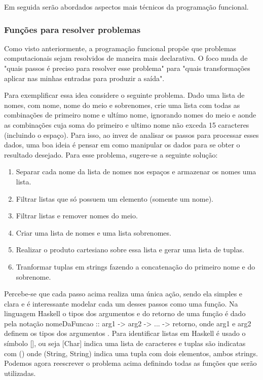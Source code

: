 Em seguida serão abordados aspectos mais técnicos da programação funcional.

\subsubsection{Funções para resolver problemas}

Como visto anteriormente, a programação funcional propõe que problemas computacionais sejam resolvidos de maneira mais declarativa.
O foco muda de "quais passos é preciso para resolver esse problema" para "quais transformações aplicar nas minhas entradas para produzir a saída".

Para exemplificar essa idea considere o seguinte problema.
Dado uma lista de nomes, com nome, nome do meio e sobrenomes, crie uma lista com todas as combinações de primeiro nome e ultímo nome, ignorando nomes do meio e aonde as combinações cuja soma do primeiro e ultimo nome não exceda 15 caracteres (incluindo o espaço).
Para isso, ao invez de analisar os passos para processar esses dados, uma boa ideia é pensar em como manipular os dados para se obter o resultado desejado.
Para esse problema, sugere-se a seguinte solução:

\begin{enumerate}
\item{Separar cada nome da lista de nomes nos espaços e armazenar os nomes uma lista.}
\item{Filtrar listas que só possuem um elemento (somente um nome).}
\item{Filtrar listas e remover nomes do meio.}
\item{Criar uma lista de nomes e uma lista sobrenomes.}
\item{Realizar o produto cartesiano sobre essa lista e gerar uma lista de tuplas.}
\item{Tranformar tuplas em strings fazendo a concatenação do primeiro nome e do sobrenome.}
\end{enumerate}

Percebe-se que cada passo acima realiza uma única ação, sendo ela simples e clara e é interessante modelar cada um desses passos como uma função.
Na linguagem Haskell o tipos dos argumentos e do retorno de uma função é dado pela notação nomeDaFuncao :: arg1 -> arg2 -> ... -> retorno, onde arg1 e arg2 definem os tipos dos argumentos \cite{lipovaca}.
Para identificar listas em Haskell é usado o símbolo [], ou seja [Char] indica uma lista de caracteres e tuplas são indicatas com () onde (String, String) indica uma tupla com dois elementos, ambos strings.
Podemos agora reescrever o problema acima definindo todas as funções que serão utilizadas.

